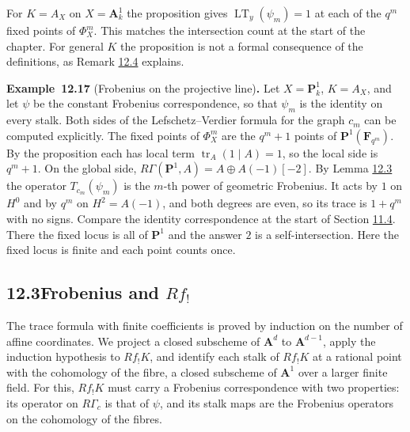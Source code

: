 \documentclass[11pt]{article}
\newenvironment{bpstatement}[2]{\par\addvspace{0.6\baselineskip}\noindent\textbf{#1}#2\textbf{.}\enspace\ignorespaces}
  {\par\addvspace{0.4\baselineskip}}
\begin{document}
\label{bp276}%
For \(K=A_X\) on \(X=\mathbf A^1_k\) the proposition gives \(\operatorname{LT}_y(\psi_m)=1\) at each of the \(q^m\) fixed points of \(\Phi^m_X\). This matches the intersection count at the start of the chapter. For general \(K\) the proposition is not a formal consequence of the definitions, as Remark \hyperref[bp239]{12.4} explains.

\label{bp277}%
\begin{bpstatement}{Example~12.17}{ (Frobenius on the projective line)}
Let \(X=\mathbf P^1_k\), \(K=A_X\), and let \(\psi\) be the constant Frobenius correspondence, so that \(\psi_m\) is the identity on every stalk. Both sides of the Lefschetz–Verdier formula for the graph \(c_m\) can be computed explicitly. The fixed points of \(\Phi_X^m\) are the \(q^m+1\) points of \(\mathbf P^1(\mathbf F_{q^m})\). By the proposition each has local term \(\operatorname{tr}_A(1\mid A)=1\), so the local side is \(q^m+1\). On the global side, \(R\Gamma(\mathbf P^1,A)=A\oplus A(-1)[-2]\). By Lemma \hyperref[bp234]{12.3} the operator \(T_{c_m}(\psi_m)\) is the \(m\)-th power of geometric Frobenius. It acts by \(1\) on \(H^0\) and by \(q^m\) on \(H^2=A(-1)\), and both degrees are even, so its trace is \(1+q^m\) with no signs. Compare the identity correspondence at the start of Section \hyperref[bp195]{11.4}. There the fixed locus is all of \(\mathbf P^1\) and the answer \(2\) is a self-intersection. Here the fixed locus is finite and each point counts once.
\end{bpstatement}



\subsection*{\texorpdfstring{12.3\quad Frobenius and $Rf_!$}{12.3 Frobenius and Rf!}}
\label{bp278}%
\label{bp279}%
The trace formula with finite coefficients is proved by induction on the number of affine coordinates. We project a closed subscheme of \(\mathbf A^d\) to \(\mathbf A^{d-1}\), apply the induction hypothesis to \(Rf_!K\), and identify each stalk of \(Rf_!K\) at a rational point with the cohomology of the fibre, a closed subscheme of \(\mathbf A^1\) over a larger finite field. For this, \(Rf_!K\) must carry a Frobenius correspondence with two properties: its operator on \(R\Gamma_c\) is that of \(\psi\), and its stalk maps are the Frobenius operators on the cohomology of the fibres.
\end{document}
